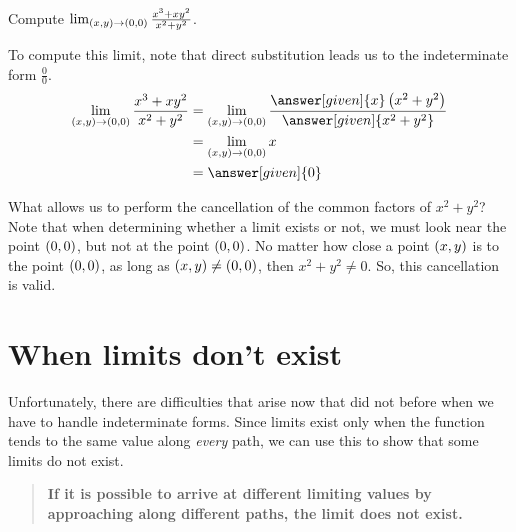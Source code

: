 \documentclass{ximera}
\begin{document}
\begin{example}
  Compute $\lim_{\left(x,y\right)\to\left(0,0\right)} \frac{x^3+xy^2}{x^2+y^2}$. 
  \begin{explanation}
   To compute this limit, note that direct substitution leads us to the indeterminate form $\frac{0}{0}$.      
    \begin{align*}
      \lim_{\point{x,y}\to\point{0,0}}\frac{x^3+xy^2}{x^2+y^2}
      &=\lim_{\point{x,y}\to\point{0,0}} \frac{\answer[given]{x}\left(x^2+y^2\right)}{\answer[given]{x^2+y^2}}\\
      &=\lim_{\point{x,y}\to\point{0,0}} x\\
      &=\answer[given]{0}
    \end{align*}
    
    What allows us to perform the cancellation of the common factors of $x^2+y^2$?  Note that when determining whether a limit exists or not, we must look near the point $\left(0,0\right)$, but not at the point $\left(0,0\right)$.  No matter how close a point  $\left(x,y\right)$ is to the point $\left(0,0\right)$, as long as  $\left(x,y\right) \neq \left(0,0\right)$, then $x^2+y^2 \neq 0$. So, this cancellation is valid.
  \end{explanation}
\end{example}

\section{When limits don't exist}
Unfortunately, there are difficulties that arise now that did not before when we have to handle indeterminate forms.  Since limits exist only when the function tends to the same value along \emph{every} path, we can use this to show that some limits do not exist.  

\begin{quote}
  \textbf{If it is possible to arrive at different limiting values by
    approaching along different paths, the limit does not exist.}
\end{quote}
\end{document}
